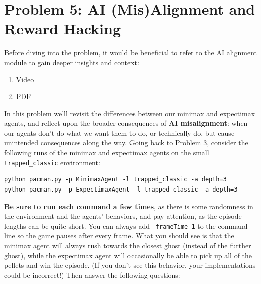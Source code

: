 \documentclass{article}
\theoremstyle{case}
\theoremstyle{definition}
\begin{document}
\newpage
\section*{Problem 5: AI (Mis)Alignment and Reward Hacking}
Before diving into the problem, it would be beneficial to refer to the AI alignment module to gain deeper insights and context:
\begin{enumerate}
    \item \href{https://www.youtube.com/watch?v=5WHObJWE1FE&t=5s}{Video}
    \item \href{https://stanford-cs221.github.io/autumn2024-extra/modules/games/ai-alignment-problem.pdf}{PDF}
\end{enumerate}
In this problem we'll revisit the differences between our minimax and expectimax agents, and reflect upon the broader consequences of \textbf{AI misalignment}: when our agents don't do what we want them to do, or technically do, but cause unintended consequences along the way. Going back to Problem 3, consider the following runs of the minimax and expectimax agents on the small \texttt{trapped_classic} environment:

\begin{verbatim}
python pacman.py -p MinimaxAgent -l trapped_classic -a depth=3
python pacman.py -p ExpectimaxAgent -l trapped_classic -a depth=3
\end{verbatim}

\textbf{Be sure to run each command a few times}, as there is some randomness in the environment and the agents' behaviors, and pay attention, as the episode lengths can be quite short. You can always add \texttt{--frameTime 1} to the command line so the game pauses after every frame. What you should see is that the minimax agent will always rush towards the closest ghost (instead of the further ghost), while the expectimax agent will occasionally be able to pick up all of the pellets and win the episode. (If you don't see this behavior, your implementations could be incorrect!) Then answer the following questions:
\end{document}
